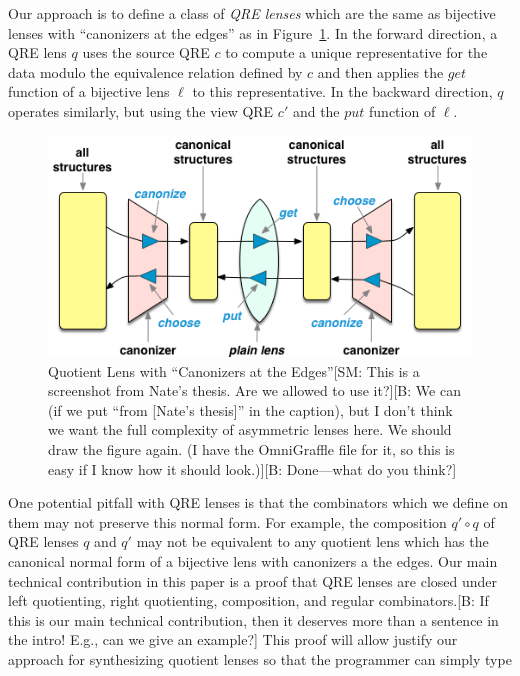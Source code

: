 \documentclass{svproc}
\newcommand{\FINISH}[3]{\ifdraft\textcolor{#1}{[#2: #3]}\fi}
\newcommand{\bcp}[1]{\FINISH{dkred}{B}{#1}}
\newcommand{\sam}[1]{\FINISH{dkpurple}{SM}{#1}}
\newcommand{\get}{\ensuremath{\mathit{get}}}
\newcommand{\lput}{\ensuremath{\mathit{put}}}
\begin{document}
Our approach is to define a class of {\em QRE lenses} which are the same as
bijective lenses with ``canonizers at the edges'' as in
Figure~\ref{fig:attheedges}. In the forward direction, a QRE lens $q$ uses the
source QRE $c$ to compute a unique representative for the data modulo the
equivalence relation defined by $c$ and then applies the $\get$ function of a
bijective lens $\ell$ to this representative. In the backward direction, $q$
operates similarly, but using the view QRE $c'$ and the $\lput$ function of
$\ell$.

\begin{figure}[t]
  \centering
  \includegraphics[width=\textwidth]{canonizers-outside}
  \caption{Quotient Lens with ``Canonizers at the Edges''\sam{This is a
      screenshot from Nate's thesis. Are we allowed to use it?}\bcp{We can
      (if we put ``from [Nate's thesis]'' in the caption), but I don't think
      we want the full complexity of asymmetric lenses here.  We should draw
      the figure again.  (I have the OmniGraffle file for it, so this is
      easy if I know how it should look.)}\bcp{Done---what do you think?}}
  \label{fig:attheedges}
\end{figure}

One potential pitfall with QRE lenses is that the combinators which
we define on them may not preserve this normal form. For example, the
composition $q' \circ q$ of QRE lenses $q$ and $q'$ may not be equivalent to
any quotient lens which has the canonical normal form of a bijective lens with
canonizers a the edges. Our main technical contribution in this paper is a
proof that QRE lenses are closed under left quotienting, right quotienting,
composition, and regular combinators.\bcp{If this is our main technical
  contribution, then it deserves more than a sentence in the intro!  E.g.,
  can we give an example?} This proof will allow justify our
approach for synthesizing quotient lenses so that the programmer can simply
type
\end{document}
